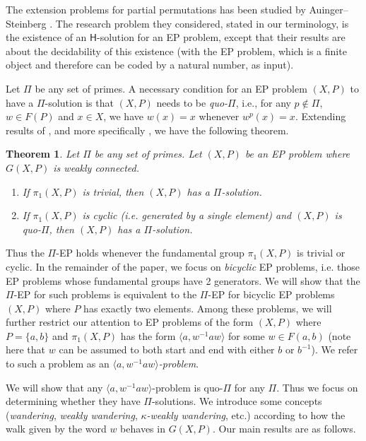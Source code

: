 \documentclass[11pt]{amsart}
\newtheorem{theorem}{Theorem}[section]
\theoremstyle{definition}
\theoremstyle{definition}
\numberwithin{equation}{section}
\begin{document}
The extension problems for partial permutations has been studied by Auinger--Steinberg \cite{AS03}. The research problem they considered, stated in our terminology, is the existence of an $\mathsf{H}$-solution for an EP problem, except that their results are about the decidability of this existence (with the EP problem, which is a finite object and therefore can be coded by a natural number, as input). 

Let $\Pi$ be any set of primes. A necessary condition for an EP problem $(X, P)$ to have a $\Pi$-solution is that $(X, P)$ needs to be \emph{quo-$\Pi$}, i.e., for any $p\not\in \Pi$, $w\in F(P)$ and $x\in X$, we have $w(x)=x$ whenever $w^p(x)=x$. Extending results of \cite{HPSW19}, and more specifically \cite[Theorem 1.5]{HPSW19}, we have the following theorem.

\begin{theorem}\label{thm:basic} Let $\Pi$ be any set of primes. Let $(X, P)$ be an EP problem where $G(X, P)$ is weakly connected.
\begin{enumerate}
\item[\rm (1)] If $\pi_1(X, P)$ is trivial, then $(X, P)$ has a $\Pi$-solution.
\item[\rm (2)] If $\pi_1(X, P)$ is cyclic (i.e. generated by a single element) and $(X, P)$ is quo-$\Pi$, then $(X, P)$ has a $\Pi$-solution.
\end{enumerate}
\end{theorem}

Thus the $\Pi$-EP holds whenever the fundamental group $\pi_1(X, P)$ is trivial or cyclic. In the remainder of the paper, we focus on \emph{bicyclic} EP problems, i.e. those EP problems whose fundamental groups have 2 generators. We will show that the $\Pi$-EP for such problems is equivalent to the $\Pi$-EP for bicyclic EP problems $(X, P)$ where $P$ has exactly two elements. Among these problems, we will further restrict our attention to EP problems of the form $(X, P)$ where $P=\{a, b\}$ and $\pi_1(X,P)$ has the form $\langle a, w^{-1}aw\rangle$ for some $w\in F(a, b)$ (note here that $w$ can be assumed to both start and end with either $b$ or $b^{-1}$). We refer to such a problem as an \emph{$\langle a, w^{-1}aw\rangle$-problem}. 

We will show that any $\langle a, w^{-1}aw\rangle$-problem is quo-$\Pi$ for any $\Pi$. Thus we focus on determining whether they have $\Pi$-solutions. We introduce some concepts (\emph{wandering}, \emph{weakly wandering}, \emph{$\kappa$-weakly wandering}, etc.) according to how the walk given by the word $w$ behaves in $G(X,P)$. Our main results are as follows.
\end{document}
